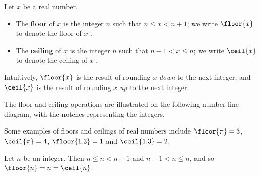 \begin{definition}
\label{defFloorCeiling}
Let $x$ be a real number.
\begin{itemize}
\item The \textbf{floor} of $x$ is the integer $n$ such that $n \le x < n+1$; we write $\floor{x}$ to denote the floor of $x$ .

\item The \textbf{ceiling} of $x$ is the integer $n$ such that $n-1 < x \le n$; we write $\ceil{x}$ to denote the ceiling of $x$ .
\end{itemize}

Intuitively, $\floor{x}$ is the result of rounding $x$ \textit{down} to the next integer, and $\ceil{x}$ is the result of rounding $x$ \textit{up} to the next integer.

The floor and ceiling operations are illustrated on the following number line diagram, with the notches representing the integers.
\begin{center}
\end{center}
\end{definition}

\begin{example}
Some examples of floors and ceilings of real numbers include $\floor{\pi} = 3$, $\ceil{\pi} = 4$, $\floor{1.3} = 1$ and $\ceil{1.3} = 2$.
\end{example}

\begin{example}
Let $n$ be an integer. Then $n \le n < n+1$ and $n-1 < n \le n$, and so $\floor{n} = n = \ceil{n}$.
\end{example}

